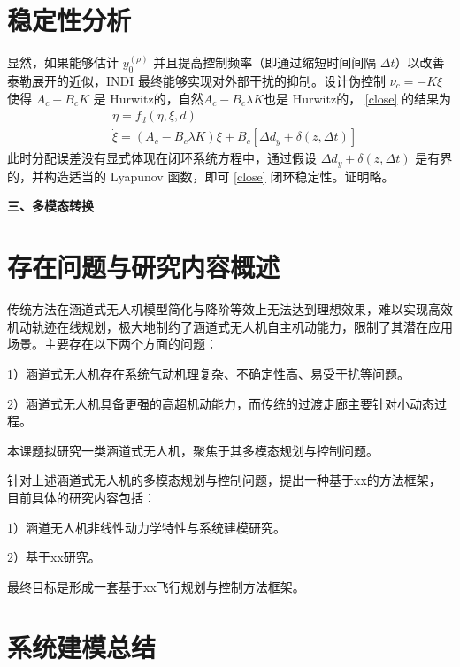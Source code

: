\begin{ubox}
\section{稳定性分析}


显然，如果能够估计 $ y_{0}^{(\rho)} $ 并且提高控制频率（即通过缩短时间间隔 $\Delta t$）以改善泰勒展开的近似，INDI 最终能够实现对外部干扰的抑制。设计伪控制 $\nu_c = -K \xi$ 使得 $A_c - B_c K$ 是 Hurwitz的，自然$A_c - B_c \lambda K$也是 Hurwitz的， \eqref{close} 的结果为
\begin{equation}
  \begin{aligned}
    &\dot{\eta}= f_{d}(\eta,\xi,d)\\
    &\dot{\xi}=(A_{c}-B_{c}\lambda K)\xi+B_{c}[\Delta d_y+\delta(z,\Delta t)]
  \end{aligned}
  \label{close2}
\end{equation}
此时分配误差没有显式体现在闭环系统方程中，通过假设 $\Delta d_y+\delta(z,\Delta t)$ 是有界的，并构造适当的 Lyapunov 函数，即可 \eqref{close} 闭环稳定性。证明略。




\textbf{\fangsong\xiaosihao 三、多模态转换}
\setcounter{section}{0}
\setcounter{subsection}{0}
\section{存在问题与研究内容概述}

传统方法在涵道式无人机模型简化与降阶等效上无法达到理想效果，难以实现高效机动轨迹在线规划，极大地制约了涵道式无人机自主机动能力，限制了其潜在应用场景。主要存在以下两个方面的问题：

1）涵道式无人机存在系统气动机理复杂、不确定性高、易受干扰等问题。

2）涵道式无人机具备更强的高超机动能力，而传统的过渡走廊主要针对小动态过程。


本课题拟研究一类涵道式无人机，聚焦于其多模态规划与控制问题。

针对上述涵道式无人机的多模态规划与控制问题，提出一种基于xx的方法框架，目前具体的研究内容包括：


1）涵道无人机非线性动力学特性与系统建模研究。

2）基于xx研究。

最终目标是形成一套基于xx飞行规划与控制方法框架。


\section{系统建模总结}


\end{ubox}
